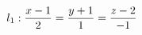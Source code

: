 \documentclass[preview]{standalone}
\begin{document}
\begin{align*}
\special{dvisvgm:raw <g id='unique000'>}l_1:\dfrac{x-1}{2}=\dfrac{y+1}{1}=\dfrac{z-2}{-1}\special{dvisvgm:raw </g>}
\end{align*}
\end{document}
